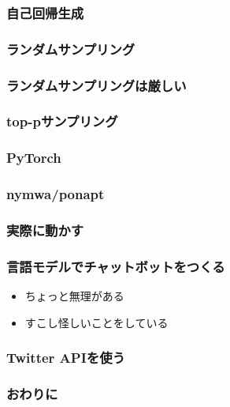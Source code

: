 \documentclass[14pt]{beamer}
\begin{document}
\begin{frame}
	\frametitle{自己回帰生成}
\end{frame}

\begin{frame}
	\frametitle{ランダムサンプリング}
\end{frame}

\begin{frame}
	\frametitle{ランダムサンプリングは厳しい}
\end{frame}

\begin{frame}
	\frametitle{top-pサンプリング}
\end{frame}

\begin{frame}
	\frametitle{PyTorch}
\end{frame}

\begin{frame}
	\frametitle{nymwa/ponapt}
\end{frame}

\begin{frame}
	\frametitle{実際に動かす}
\end{frame}

\begin{frame}
	\frametitle{言語モデルでチャットボットをつくる}

	\begin{itemize}
		\item ちょっと無理がある
		\item すこし怪しいことをしている
	\end{itemize}
\end{frame}

\begin{frame}
	\frametitle{Twitter APIを使う}
\end{frame}

\begin{frame}
	\frametitle{おわりに}
\end{frame}
\end{document}
